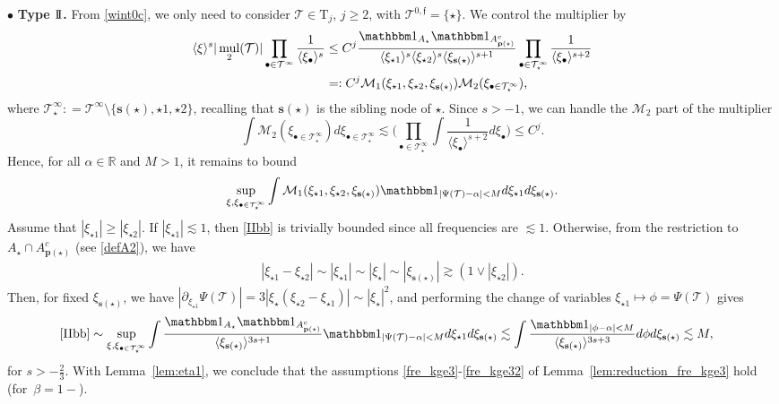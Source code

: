 \documentclass[a4paper,
11pt,  reqno]{amsart}
\newcommand{\II}{\textup{I \hspace{-2.9mm} I} }
\newcommand{\5}{\textup{V}}
\newcommand{\noi}{\noindent}
\newcommand{\ind}{\mathbbm 1}
\newcommand{\les}{\lesssim}
\theoremstyle{remark}
\newcommand{\R}{\mathbb{R}}
\newcommand{\bul}{\bullet}
\newcommand{\TT}{\mathcal{T}}
\newcommand{\Tr}{\mathrm{T}}
\newcommand{\al}{\alpha}
\newcommand{\be}{\beta}
\newcommand{\pb}{\mathbf{p}}
\newcommand{\sbf}{\mathbf{s}}
\newcommand{\ges}{\gtrsim}
\newcommand{\jb}[1]
{\langle #1 \rangle}
\newcommand{\ff}{\mathfrak{f}}
\newcommand{\M}{\mathcal{M}}
\DeclareMathOperator{\mul}{mul}
\numberwithin{equation}{section}
\numberwithin{theorem}{section}
\begin{document}
\medskip 
\noi
$\bul$ \textbf{Type $\II$.} From \eqref{wint0c}, we only need to consider $\TT\in \Tr_j$, $j\ge 2$, with $\TT^{0,\ff}=\{\star\}$. We control the multiplier by
\begin{align}\label{L22}
\jb{\xi}^s |\mul_2(\TT)| \prod_{\bul \in \TT^\infty} \frac{1}{\jb{\xi_\bul}^s}
&
\le
{C^j}
\frac{ \ind_{A_\star} \ind_{A^c_{\pb(\star)}} }{ \jb{\xi_{\star1}}^s \jb{\xi_{\star2}}^s  \jb{\xi_{\sbf(\star)}}^{s+1} } \prod_{\bul \in \TT^{\infty}_\star } \frac{1}{\jb{\xi_{\bul}}^{s+2}}
\\
&
=: 
{C^j}
\mathcal{M}_1(\xi_{\star1}, \xi_{\star2}, \xi_{\sbf(\star)})\mathcal{M}_2(\xi_{\bul\in \TT^\infty_\star}) 
,
\end{align}
 where 
 $\TT^\infty_\star : = \TT^\infty\setminus \{\sbf(\star), \star1, \star2\}$, 
 {
 recalling that $\sbf(\star)$ is the sibling node of $\star$.}
Since $s>-1$, we can handle the $\M_2$ part of the multiplier 
\begin{equation}\label{eq:estMlinha}
    \int \mathcal{M}_2(\xi_{\bul\in \TT^\infty_\star})  d\xi_{\bul\in\TT^\infty_\star} \lesssim \bigg(
\prod_{\bul \in \TT^\infty_\star }
\int \frac{1}{ \jb{\xi_{\bul}}^{s+2} } d\xi_{\bul} \bigg)  \le C^j.
\end{equation}
Hence, {for all $\al\in\R$ and $M>1$, }it remains to bound
\begin{align}
\label{IIbb}
\sup_{\xi, \xi_{\bul\in\TT^\infty_\star}}
\int \mathcal{M}_1(\xi_{\star1}, \xi_{\star2}, \xi_{\sbf(\star)})\ind_{|\Psi(\TT) - \al| < M} d\xi_{\star1} d\xi_{\sbf(\star)}.
\end{align}
Assume that
$|\xi_{\star1} | \ge |\xi_{\star2}|$.
If $|\xi_{\star1}| \les 1$, then  \eqref{IIbb} is trivially bounded since all frequencies are $\les 1$. Otherwise, from the restriction to $A_\star\cap A^c_{\pb(\star)}$ (see \eqref{defA2}), we have 
\begin{align}
|\xi_{\star1}   - \xi_{\star2}| \sim |\xi_{\star1}| \sim |\xi_\star| \sim |\xi_{\sbf(\star)}| \ges (1\lor |\xi_{\star2}|). 
\end{align}
Then, for fixed $\xi_{\sbf(\star)}$, we have $|\partial_{\xi_{\star1}} \Psi(\TT) | = 3| \xi_\star  (\xi_{\star2} - \xi_{\star1})| \sim |\xi_{\star}|^2$, 
and performing the change of variables $\xi_{\star1} \mapsto \phi = \Psi(\TT)$ gives
\begin{align}\label{IIb}
\begin{split}
\eqref{IIbb}
&
\sim
\sup_{\xi, \xi_{\bul\in\TT^\infty_\star}}
\int \frac{\ind_{A_\star} \ind_{A^c_{\pb(\star)}}}{ \jb{\xi_{\sbf(\star)}}^{3s+1}  } \ind_{|\Psi(\TT) - \al| < M } d\xi_{\star1} d\xi_{\sbf(\star)}
\les 
\int \frac{\ind_{|\phi - \al| < M } }{ \jb{\xi_{\sbf(\star)}}^{3s+3}  } d\phi d\xi_{\sbf(\star)} \les M,
\end{split}
\end{align}
for $s>-\frac23$. 
{
With Lemma~\ref{lem:eta1}, we conclude that the assumptions \eqref{fre_kge3}-\eqref{fre_kge32} of Lemma~\ref{lem:reduction_fre_kge3} hold (for~$\be=1-$).
}
\end{document}
